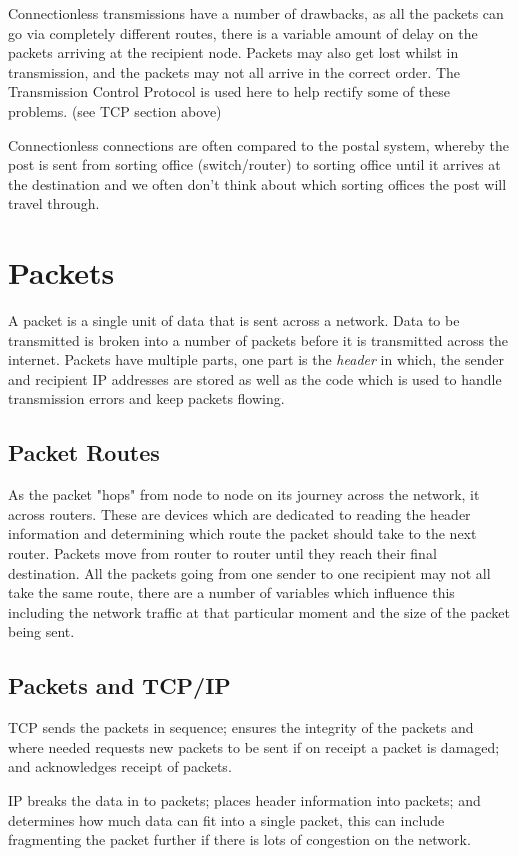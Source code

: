 Connectionless transmissions have a number of drawbacks, as all the packets can go via completely different routes, there is a variable amount of delay on the packets arriving at the recipient node. Packets may also get lost whilst in transmission, and the packets may not all arrive in the correct order. The Transmission Control Protocol is used here to help rectify some of these problems. (see TCP section above)

Connectionless connections are often compared to the postal system, whereby the post is sent from sorting office (switch/router) to sorting office until it arrives at the destination and we often don't think about which sorting offices the post will travel through.


\section*{Packets}
A packet is a single unit of data that is sent across a network. Data to be transmitted is broken into a number of packets before it is transmitted across the internet. Packets have multiple parts, one part is the \textit{header} in which, the sender and recipient IP addresses are stored as well as the code which is used to handle transmission errors and keep packets flowing.
\subsection*{Packet Routes}
As the packet "hops" from node to node on its journey across the network, it across routers. These are devices which are dedicated to reading the header information and determining which route the packet should take to the next router. Packets move from router to router until they reach their final destination. All the packets going from one sender to one recipient may not all take the same route, there are a number of variables which influence this including the network traffic at that particular moment and the size of the packet being sent. 
\subsection*{Packets and TCP/IP}
TCP sends the packets in sequence; ensures the integrity of the packets and where needed requests new packets to be sent if on receipt a packet is damaged; and acknowledges receipt of packets. 

IP breaks the data in to packets; places header information into packets; and determines how much data can fit into a single packet, this can include fragmenting the packet further if there is lots of congestion on the network. 

